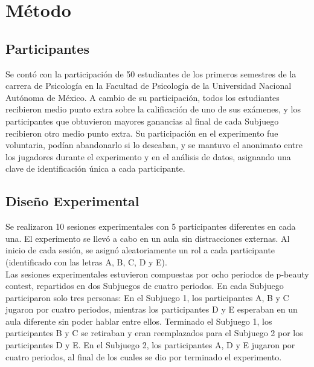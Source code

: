 
\chapter{Método} %

\label{Cap_Exp} %

\section{Participantes}

Se contó con la participación de 50 estudiantes de los primeros semestres de la carrera de Psicología en la Facultad de Psicología de la Universidad Nacional Autónoma de México. A cambio de su participación, todos los estudiantes recibieron medio punto extra sobre la  calificación de uno de sus exámenes, y  los participantes que obtuvieron mayores ganancias al final de cada Subjuego recibieron otro medio punto extra. Su participación en el experimento fue voluntaria, podían abandonarlo si lo deseaban, y se mantuvo el anonimato entre los jugadores durante el experimento y en el análisis de datos, asignando una clave de identificación única a cada participante.\\

\section{Diseño Experimental}

Se realizaron 10 sesiones experimentales con  5 participantes diferentes en cada una. El experimento se llevó a cabo en un aula sin distracciones externas. Al inicio de cada sesión, se asignó aleatoriamente un rol a cada participante (identificado con las letras A, B, C, D y E).\\

Las sesiones experimentales estuvieron compuestas por ocho periodos de p-beauty contest, repartidos en dos Subjuegos de cuatro periodos. En cada Subjuego participaron solo tres personas: En el Subjuego 1, los participantes A, B y C jugaron por cuatro periodos, mientras los participantes D y E esperaban en un aula diferente sin poder hablar entre ellos. Terminado el Subjuego 1, los participantes B y C se retiraban y eran reemplazados para el Subjuego 2 por los participantes D y E. En el Subjuego 2, los participantes A, D y E jugaron por cuatro periodos, al final de los cuales se dio por terminado el experimento.\\

